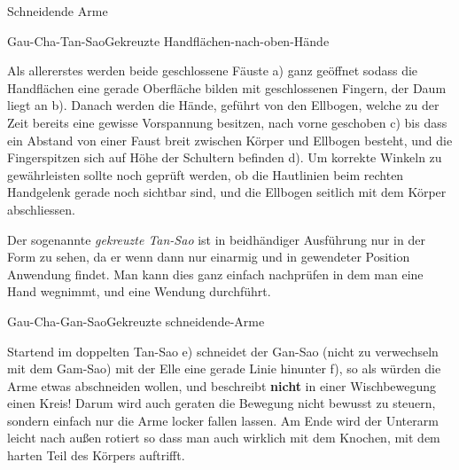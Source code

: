 
\begin{WTSatz}{Schneidende Arme}%


	\begin{WTSatzTeil}{Gau-Cha-Tan-Sao}{Gekreuzte Handfl\"achen-nach-oben-H\"ande}
		
		Als allererstes werden beide geschlossene F\"auste a) ganz ge\"offnet sodass die Handfl\"achen eine gerade Oberfl\"ache bilden mit geschlossenen Fingern, der Daum liegt an b). Danach werden die H\"ande, gef\"uhrt von den Ellbogen, welche zu der Zeit bereits eine gewisse Vorspannung besitzen, nach vorne geschoben c) bis dass ein Abstand von einer Faust breit zwischen K\"orper und Ellbogen besteht, und die Fingerspitzen sich auf H\"ohe der Schultern befinden d). Um korrekte Winkeln zu gew\"ahrleisten sollte noch gepr\"uft werden, ob die Hautlinien beim rechten Handgelenk gerade noch sichtbar sind, und die Ellbogen seitlich mit dem K\"orper abschliessen.
	
		
		Der sogenannte \textit{gekreuzte Tan-Sao} ist in beidh\"andiger Ausf\"uhrung nur in der Form zu sehen, da er wenn dann nur einarmig und in gewendeter Position Anwendung findet. Man kann dies ganz einfach nachpr\"ufen in dem man eine Hand wegnimmt, und eine Wendung durchf\"uhrt.
		
	\end{WTSatzTeil}
	
	\begin{WTSatzTeil}{Gau-Cha-Gan-Sao}{Gekreuzte schneidende-Arme}
		
		Startend im doppelten Tan-Sao e) schneidet der Gan-Sao (nicht zu verwechseln mit dem Gam-Sao) mit der Elle eine gerade Linie hinunter f), so als w\"urden die Arme etwas abschneiden wollen, und beschreibt \textbf{nicht} in einer Wischbewegung einen Kreis! Darum wird auch geraten die Bewegung nicht bewusst zu steuern, sondern einfach nur die Arme locker fallen lassen. Am Ende wird der Unterarm leicht nach au{\ss}en rotiert so dass man auch wirklich mit dem Knochen, mit dem harten Teil des K\"orpers auftrifft.
	\end{WTSatzTeil}
	

\end{WTSatz}
